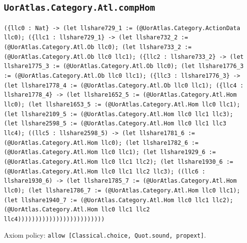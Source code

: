 \documentclass[11pt]{article}
\begin{document}
\subsection*{\texttt{UorAtlas.Category.Atl.compHom}}
\noindent\texttt{(\{llc0 : Nat\} -> (let llshare729\_1 := (@UorAtlas.Category.ActionData llc0); (\{llc1 : llshare729\_1\} -> (let llshare732\_2 := (@UorAtlas.Category.Atl.Ob llc0); (let llshare733\_2 := (@UorAtlas.Category.Atl.Ob llc0 llc1); (\{llc2 : llshare733\_2\} -> (let llshare1775\_3 := (@UorAtlas.Category.Atl.Ob llc0); (let llshare1776\_3 := (@UorAtlas.Category.Atl.Ob llc0 llc1); (\{llc3 : llshare1776\_3\} -> (let llshare1778\_4 := (@UorAtlas.Category.Atl.Ob llc0 llc1); (\{llc4 : llshare1778\_4\} -> (let llshare1652\_5 := (@UorAtlas.Category.Atl.Hom llc0); (let llshare1653\_5 := (@UorAtlas.Category.Atl.Hom llc0 llc1); (let llshare2109\_5 := (@UorAtlas.Category.Atl.Hom llc0 llc1 llc3); (let llshare2598\_5 := (@UorAtlas.Category.Atl.Hom llc0 llc1 llc3 llc4); ((llc5 : llshare2598\_5) -> (let llshare1781\_6 := (@UorAtlas.Category.Atl.Hom llc0); (let llshare1782\_6 := (@UorAtlas.Category.Atl.Hom llc0 llc1); (let llshare1929\_6 := (@UorAtlas.Category.Atl.Hom llc0 llc1 llc2); (let llshare1930\_6 := (@UorAtlas.Category.Atl.Hom llc0 llc1 llc2 llc3); ((llc6 : llshare1930\_6) -> (let llshare1785\_7 := (@UorAtlas.Category.Atl.Hom llc0); (let llshare1786\_7 := (@UorAtlas.Category.Atl.Hom llc0 llc1); (let llshare1940\_7 := (@UorAtlas.Category.Atl.Hom llc0 llc1 llc2); (@UorAtlas.Category.Atl.Hom llc0 llc1 llc2 llc4)))))))))))))))))))))))))}\par
\noindent Axiom policy: \texttt{allow [Classical.choice, Quot.sound, propext]}.\par
\end{document}
